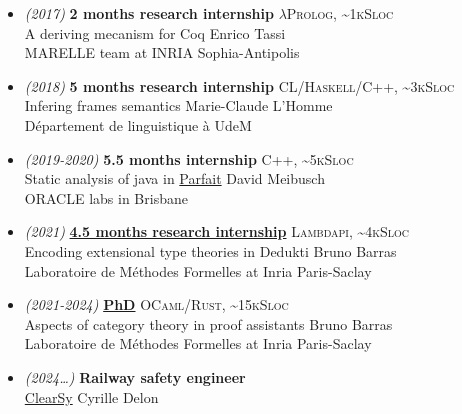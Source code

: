 \documentclass[a4paper,11pt]{extarticle}
\newcommand{\lang}[2]{\hfill \textsc{\scriptsize #1, \textasciitilde#2Sloc}}
\newcommand{\director}[1]{\hfill {\scriptsize #1}}
\begin{document}
\begin{minipage}[c][282mm][t]{0.60\linewidth}
{        \begin{itemize}
          \itemsep0em
          \item \emph{\small (2017)} \textbf{2 months research internship}
                \lang{$\lambda$Prolog}{1k}\\
                A deriving mecanism for Coq
                \director{Enrico Tassi} \\
                MARELLE team at INRIA Sophia-Antipolis
          \item \emph{\small (2018)} \textbf{5 months research internship}
                \lang{CL/Haskell/C++}{3k}\\
                Infering frames semantics
                \director{Marie-Claude L'Homme}\\
                Département de linguistique à UdeM
          \item \emph{\small (2019-2020)} \textbf{5.5 months internship}
                \lang{C++}{5k}\\
                Static analysis of java in \href{https://labs.oracle.com/pls/apex/f?p=LABS:project_details:0:13}{Parfait}
                \director{David Meibusch}\\
                ORACLE labs in Brisbane
          \item \emph{\small (2021)} \textbf{\href{https://github.com/dwarfmaster/ett-in-lambdapi}{4.5 months research internship}}
                \lang{Lambdapi}{4k}\\
                Encoding extensional type theories in Dedukti
                \director{Bruno Barras} \\
                Laboratoire de Méthodes Formelles at Inria Paris-Saclay
          \item \emph{\small (2021-2024)} \textbf{\href{https://github.com/dwarfmaster/commutative-diagrams}{PhD}}
                \lang{OCaml/Rust}{15k} \\
                Aspects of category theory in proof assistants
                \director{Bruno Barras} \\
                Laboratoire de Méthodes Formelles at Inria Paris-Saclay
          \item \emph{\small (2024\dots)} \textbf{Railway safety engineer} \\
                \href{https://www.clearsy.com/}{ClearSy}
                \director{Cyrille Delon}
        \end{itemize}

}
\end{minipage}
\end{document}
